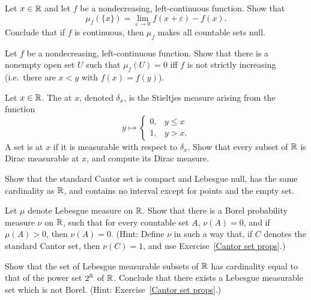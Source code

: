 \begin{exercise}
Let $x \in \mathbb{R}$ and let $f$ be a nondecreasing, left-continuous function. Show that
\[\mu_{f}(\{x\}) = \lim_{\varepsilon \to 0} f(x+\varepsilon) - f(x).\]
Conclude that if $f$ is continuous, then $\mu_{f}$ makes all countable sets null.
\end{exercise}

\begin{exercise}
Let $f$ be a nondecreasing, left-continuous function. Show that there is a nonempty open set $U$ such that $\mu_{f}(U) = 0$ iff $f$ is not strictly increasing (i.e.\ there are $x < y$ with $f(x) = f(y)$).
\end{exercise}

\begin{exercise}\label{Dirac measure}
Let $x \in \mathbb{R}$. The  at $x$, denoted $\delta_{x}$, is the Stieltjes measure arising from the function
\[y \mapsto \begin{cases}
0, &y \leq x\\
1, &y > x.
\end{cases}\]
A set is  at $x$ if it is measurable with respect to $\delta_{x}$.
Show that every subset of $\mathbb{R}$ is Dirac measurable at $x$, and compute its Dirac measure.
\end{exercise}

\begin{exercise}\label{Cantor set props}
Show that the standard Cantor set is compact and Lebesgue null, has the same cardinality as $\mathbb{R}$, and contains no interval except for points and the empty set.
\end{exercise}

\begin{exercise}
Let $\mu$ denote Lebesgue measure on $\mathbb{R}$.
Show that there is a Borel probability measure $\nu$ on $\mathbb{R}$, such that for every countable set $A$, $\nu(A) = 0$, and if $\mu(A) > 0$, then $\nu(A) = 0$.
(Hint: Define $\nu$ in such a way that, if $C$ denotes the standard Cantor set, then $\nu(C) = 1$, and use Exercise~\ref{Cantor set props}.)
\end{exercise}

\begin{exercise}
Show that the set of Lebesgue measurable subsets of $\mathbb{R}$ has cardinality equal to that of the power set $2^{\mathbb{R}}$ of $\mathbb{R}$. Conclude that there exists a Lebesgue measurable set which is not Borel.
(Hint: Exercise~\ref{Cantor set props}.)
\end{exercise}

